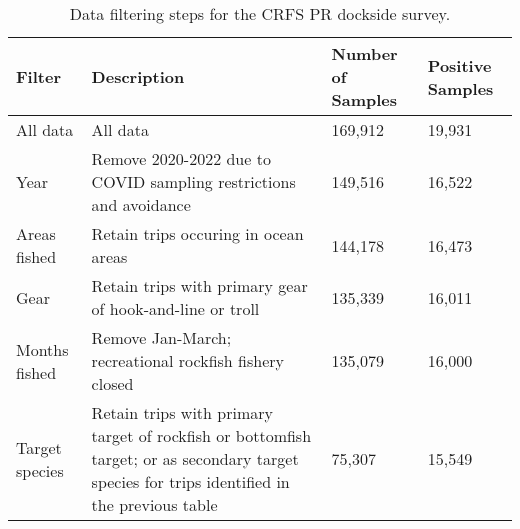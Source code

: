 \documentclass[11pt,
  letterpaper,
]{article}
\begin{document}
\begin{landscape}\begin{table}[H]
\centering
\caption{\label{tab:pr-filter}Data filtering steps for the CRFS PR dockside survey.}
\centering
\fontsize{9}{11}\selectfont
\fontsize{9}{11}\selectfont
\begin{tabular}[t]{l>{\raggedright\arraybackslash}p{8cm}ll}
\toprule
Filter & Description & Number of Samples & Positive Samples\\
\midrule
All data & All data & 169,912 & 19,931\\
Year & Remove 2020-2022 due to COVID sampling restrictions 
                                         and avoidance & 149,516 & 16,522\\
Areas fished & Retain trips occuring in ocean areas & 144,178 & 16,473\\
Gear & Retain trips with primary gear of hook-and-line or troll & 135,339 & 16,011\\
Months fished & Remove Jan-March; recreational rockfish fishery closed & 135,079 & 16,000\\
Target species & Retain trips with primary target of 
rockfish or bottomfish target; or as secondary target species for trips identified in 
the previous table & 75,307 & 15,549\\
\bottomrule
\end{tabular}
\end{table}
\end{landscape}
\end{document}

